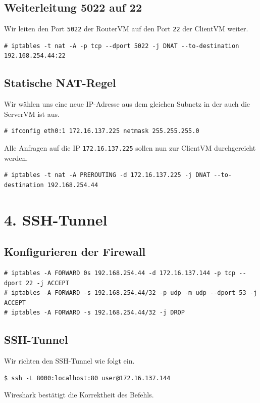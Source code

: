 \documentclass[10pt,a4paper]{article}
\begin{document}
\subsection{Weiterleitung 5022 auf 22} %

Wir leiten den Port \texttt{5022} der RouterVM auf den Port \texttt{22} der ClientVM weiter.
\begin{verbatim}
# iptables -t nat -A -p tcp --dport 5022 -j DNAT --to-destination 192.168.254.44:22 
\end{verbatim}

\subsection{Statische NAT-Regel} %

Wir wählen uns eine neue IP-Adresse aus dem gleichen Subnetz in der auch die ServerVM ist aus.
\begin{verbatim}
# ifconfig eth0:1 172.16.137.225 netmask 255.255.255.0
\end{verbatim}
Alle Anfragen auf die IP \texttt{172.16.137.225} sollen nun zur ClientVM durchgereicht werden.
\begin{verbatim}
# iptables -t nat -A PREROUTING -d 172.16.137.225 -j DNAT --to-destination 192.168.254.44
\end{verbatim}

\setcounter{section}{4}
\section*{4. SSH-Tunnel}
\setcounter{subsection}{0}

\subsection{Konfigurieren der Firewall}
\begin{verbatim}
# iptables -A FORWARD 0s 192.168.254.44 -d 172.16.137.144 -p tcp --dport 22 -j ACCEPT
# iptables -A FORWARD -s 192.168.254.44/32 -p udp -m udp --dport 53 -j ACCEPT
# iptables -A FORWARD -s 192.168.254.44/32 -j DROP
\end{verbatim}

\subsection{SSH-Tunnel}
Wir richten den SSH-Tunnel wie folgt ein.
\begin{verbatim}
$ ssh -L 8000:localhost:80 user@172.16.137.144
\end{verbatim}
Wireshark bestätigt die Korrektheit des Befehls.
\end{document}
